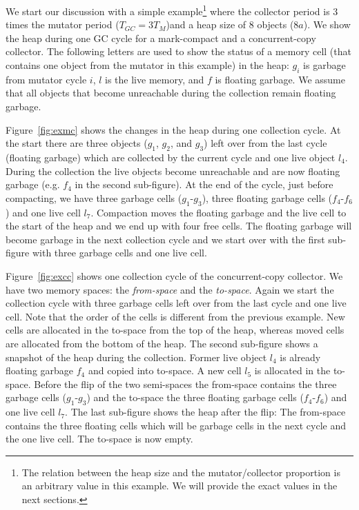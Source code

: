 We start our discussion with a simple example\footnote{The relation
between the heap size and the mutator/collector proportion is an
arbitrary value in this example. We will provide the exact values in
the next sections.} where the collector period is 3 times the
mutator period ($T_{GC} = 3 T_M$)and a heap size of 8 objects
($8a$). We show the heap during one GC cycle for a mark-compact and
a concurrent-copy collector. The following letters are used to show
the status of a memory cell (that contains one object from the
mutator in this example) in the heap: $g_i$ is garbage from mutator
cycle $i$, $l$ is the live memory, and $f$ is floating garbage. We
assume that all objects that become unreachable during the
collection remain floating garbage.

Figure~\ref{fig:exmc} shows the changes in the heap during one
collection cycle. At the start there are three objects ($g_1$,
$g_2$, and $g_3$) left over from the last cycle (floating garbage)
which are collected by the current cycle and one live object $l_4$.
During the collection the live objects become unreachable and are
now floating garbage (e.g. $f_4$ in the second sub-figure). At the
end of the cycle, just before compacting, we have three garbage
cells ($g_1$-$g_3$), three floating garbage cells ($f_4$-$f_6$) and
one live cell $l_7$. Compaction moves the floating garbage and the
live cell to the start of the heap and we end up with four free
cells. The floating garbage will become garbage in the next
collection cycle and we start over with the first sub-figure with
three garbage cells and one live cell.

Figure~\ref{fig:excc} shows one collection cycle of the
concurrent-copy collector. We have two memory spaces: the
\emph{from-space} and the \emph{to-space}. Again we start the
collection cycle with three garbage cells left over from the last
cycle and one live cell. Note that the order of the cells is
different from the previous example. New cells are allocated in the
to-space from the top of the heap, whereas moved cells are allocated
from the bottom of the heap. The second sub-figure shows a snapshot
of the heap during the collection. Former live object $l_4$ is
already floating garbage $f_4$ and copied into to-space. A new cell
$l_5$ is allocated in the to-space. Before the flip of the two
semi-spaces the from-space contains the three garbage cells
($g_1$-$g_3$) and the to-space the three floating garbage cells
($f_4$-$f_6$) and one live cell $l_7$. The last sub-figure shows the
heap after the flip: The from-space contains the three floating
cells which will be garbage cells in the next cycle and the one live
cell. The to-space is now empty.


